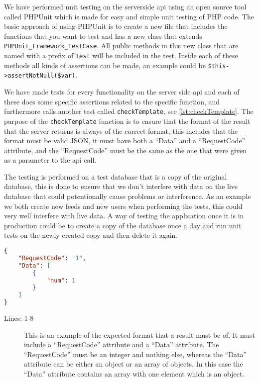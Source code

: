 We have performed unit testing on the serverside \ac{api} using an open source tool called PHPUnit\citep{phpunit} which is made for easy and simple unit testing of PHP code. The basic approach of using PHPUnit is to create a new file that includes the functions that you want to test and has a new class that extends \lstinline|PHPUnit_Framework_TestCase|. All public methods in this new class that are named with a prefix of \lstinline|test| will be included in the test. Inside each of these methods all kinds of assertions can be made, an example could be \lstinline|$this->assertNotNull($var)|.

We have made tests for every functionality on the server side \ac{api} and each of these does some specific assertions related to the specific function, and furthermore calls another test called \lstinline|checkTemplate|, see \autoref{lst:checkTemplate}. The purpose of the \lstinline|checkTemplate| function is to ensure that the format of the result that the server returns is always of the correct format, this includes that the format must be valid JSON, it must have both a ``Data'' and a ``RequestCode'' attribute, and the ``RequestCode'' must be the same as the one that were given as a parameter to the \ac{api} call.

The testing is performed on a test database that is a copy of the original database, this is done to ensure that we don't interfere with data on the live database that could potentionally cause problems or interference. As an example we both create new feeds and new users when performing the tests, this could very well interfere with live data. A way of testing the application once it is in production could be to create a copy of the database once a day and run unit tests on the newly created copy and then delete it again.

\begin{lstlisting}[language=json, label=lst:jsonFormat, caption={JSON format, in this case an example of the result from \lstinline|CheckFeeds|}]
{
    "RequestCode": "1",
    "Data": [
        {
            "num": 1
        }
    ]
}
\end{lstlisting}
\begin{description}
\item[Lines: 1-8] This is an example of the expected format that a result must be of. It must include a ``RequestCode'' attribute and a ``Data'' attribute. The ``RequestCode'' must be an integer and nothing else, whereas the ``Data'' attribute can be either an object or an array of objects. In this case the ``Data'' attribute contains an array with one element which is an object.
\end{description}


